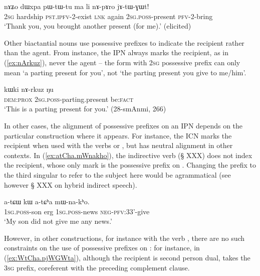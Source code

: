\begin{exe}
\ex \label{ex:nApAro}
\gll nɤʑo dɯxpa pɯ-tɯ-tu ma li nɤ-pɤro jɤ-tɯ-ɣɯt! \\
\textsc{2sg} hardship \textsc{pst}.\textsc{ipfv}-2-exist \textsc{lnk} again \textsc{2sg}.\textsc{poss}-present \textsc{pfv}-2-bring \\
\glt `Thank you, you brought another present (for me).' (elicited)
\end{exe}

Other biactantial nouns use possessive prefixes to indicate the recipient rather than the agent. From instance, the IPN  always marks the recipient, as in (\ref{ex:nArkuz}), never the agent -- the form  with \textsc{2sg} possessive prefix can only mean `a parting present for you', not `the parting present you give to me/him'.

\begin{exe}
\ex \label{ex:nArkuz}
\gll  kɯki nɤ-rkuz ŋu \\
\textsc{dem}:\textsc{prox} \textsc{2sg}.\textsc{poss}-parting.present be:\textsc{fact} \\
\glt `This is a parting present for you.' (28-smAnmi, 266)
\end{exe}
In other cases, the alignment of possessive prefixes on an IPN depends on the  particular construction where it appears. For instance, the ICN  marks the recipient when used with the verbs  or , but has neutral alignment in other contexts. In (\ref{ex:atCha.mWnakho}), the indirective verb  (§ XXX) does not index the recipient, whose only mark is the possessive prefix on . Changing the prefix to the third singular  to refer to the subject here would be agrammatical (see however § XXX on hybrid indirect speech).


\begin{exe}
\ex \label{ex:atCha.mWnakho}
\gll  a-tɕɯ kɯ a-tɕʰa mɯ-na-kʰo. \\
\textsc{1sg}.\textsc{poss}-son erg \textsc{1sg}.\textsc{poss}-news \textsc{neg}-\textsc{pfv}:3\fl{}3'-give \\
\glt `My son did not give me any news.' 
\end{exe}

However, in other constructions, for instance with the verb , there are no such constraints on the use of possessive prefixes on : for instance, in (\ref{ex:WtCha.pjWGWta}), although the recipient is second person dual,  takes the \textsc{3sg} prefix, coreferent with the preceding complement clause.

